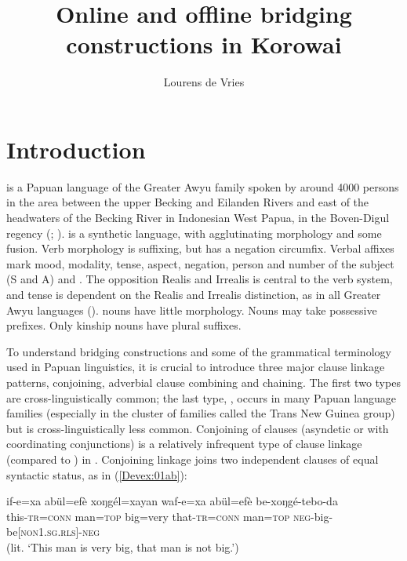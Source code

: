 \documentclass[output=paper]{LSP/langsci}
\author{Lourens de Vries\affiliation{Vrije Universiteit Amsterdam}}
\title{Online and offline bridging constructions in Korowai}
\begin{document}
\label{ch:7}

\section{Introduction} 
\label{Devsec:Introduction}
 is a Papuan language of the Greater Awyu family spoken by around 4000 persons in the area between the upper Becking and Eilanden Rivers and east of the headwaters of the Becking River in Indonesian West Papua, in the Boven-Digul regency (\citealt{enk97}; \citealt{devries.2012}).  is a synthetic language, with agglutinating morphology and some fusion. Verb morphology is suffixing, but  has a negation circumfix. Verbal affixes mark mood, modality, tense, aspect, negation, person and number of the subject (S and A) and . The opposition Realis and Irrealis is central to the verb system, and tense is dependent on the Realis and Irrealis distinction, as in all Greater Awyu languages (\citealt{wester14}).  nouns have little morphology. Nouns may take possessive prefixes. Only kinship nouns have plural suffixes.

To understand  bridging constructions and some of the grammatical terminology used in Papuan linguistics, it is crucial to introduce three major  clause linkage patterns, conjoining, adverbial clause combining and chaining. The first two types are cross-linguistically common; the last type, , occurs in many Papuan language families (especially in the cluster of families called the Trans New Guinea group) but is cross-linguistically less common. Conjoining of clauses (asyndetic or with coordinating conjunctions) is a relatively infrequent type of clause linkage (compared to ) in . Conjoining linkage joins two independent clauses of equal syntactic status, as in (\ref{Devex:01ab}):

\begin{exe}
\ex \label{Devex:01ab}
\gll if-e=xa abül=efè xoŋgél=xayan waf-e=xa abül=efè be-xoŋgé-tebo-da\\
this-\textsc{tr=conn} man=\textsc{top}	big=very that-\textsc{tr=conn}	man=\textsc{top} \textsc{neg}-big-be[\textsc{non1.sg.rls}]-\textsc{neg}\\
\glt {}
(lit. `This man is very big, that man is not big.') \citep[][71]{enk97}\\
\end{exe}
\end{document}
